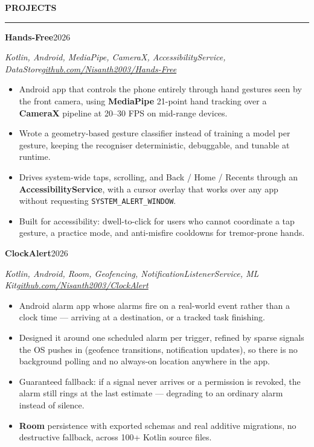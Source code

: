 \documentclass[11pt,a4paper]{article}
\newcommand{\resumeSection}[1]{%
  \vspace{7pt}%
  {\large\bfseries\color{primary}\MakeUppercase{#1}}\par
  \vspace{1pt}%
  \textcolor{secondary}{\rule{\textwidth}{0.6pt}}\par
  \vspace{3pt}%
}
\newcommand{\entryLine}[4]{%
  \par\vspace{3pt}%
  \begingroup\parfillskip=0pt\relax
    \noindent\textbf{#1}\hfill\textcolor{secondary}{#2}\par
    \noindent\textit{\textcolor{accent}{#3}}\hfill\textit{\textcolor{secondary}{#4}}\par
  \endgroup
  \vspace{1pt}%
}
\newenvironment{bullets}{%
  \begin{itemize}[leftmargin=1.4em, label=\textbullet, itemsep=1.5pt,
                  parsep=0pt, topsep=3pt, partopsep=0pt]
}{%
  \end{itemize}%
  \vspace{2pt}%
}
\begin{document}
%
%
\resumeSection{Projects}

\entryLine{Hands-Free}{2026}{Kotlin, Android, MediaPipe, CameraX, AccessibilityService, DataStore}{\href{https://github.com/Nisanth2003/Hands-Free}{github.com/Nisanth2003/Hands-Free}}
\begin{bullets}
  \item Android app that controls the phone entirely through hand gestures seen by the
        front camera, using \textbf{MediaPipe} 21-point hand tracking over a
        \textbf{CameraX} pipeline at 20--30 FPS on mid-range devices.
  \item Wrote a geometry-based gesture classifier instead of training a model per gesture,
        keeping the recogniser deterministic, debuggable, and tunable at runtime.
  \item Drives system-wide taps, scrolling, and Back / Home / Recents through an
        \textbf{AccessibilityService}, with a cursor overlay that works over any app
        without requesting \texttt{SYSTEM\_ALERT\_WINDOW}.
  \item Built for accessibility: dwell-to-click for users who cannot coordinate a tap
        gesture, a practice mode, and anti-misfire cooldowns for tremor-prone hands.
\end{bullets}

\entryLine{ClockAlert}{2026}{Kotlin, Android, Room, Geofencing, NotificationListenerService, ML Kit}{\href{https://github.com/Nisanth2003/ClockAlert}{github.com/Nisanth2003/ClockAlert}}
\begin{bullets}
  \item Android alarm app whose alarms fire on a real-world event rather than a clock
        time --- arriving at a destination, or a tracked task finishing.
  \item Designed it around one scheduled alarm per trigger, refined by sparse signals the
        OS pushes in (geofence transitions, notification updates), so there is no
        background polling and no always-on location anywhere in the app.
  \item Guaranteed fallback: if a signal never arrives or a permission is revoked, the
        alarm still rings at the last estimate --- degrading to an ordinary alarm instead
        of silence.
  \item \textbf{Room} persistence with exported schemas and real additive migrations, no
        destructive fallback, across 100+ Kotlin source files.
\end{bullets}
\end{document}
